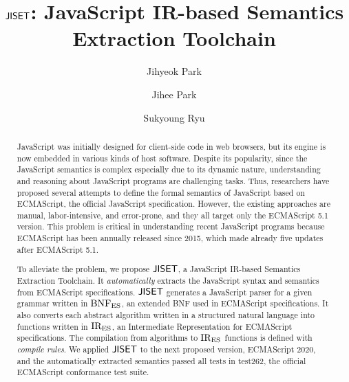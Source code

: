 \documentclass[sigconf,review,anonymous=true]{acmart}
\begin{document}
\title{\( \text{\sf JISET} \): JavaScript IR-based Semantics Extraction Toolchain}

\author{Jihyeok Park}

\author{Jihee Park}

\author{Sukyoung Ryu}

\begin{abstract}
JavaScript was initially designed for client-side code in web browsers,
but its engine is now embedded in various kinds of host software.
Despite its popularity, since the JavaScript semantics is complex
especially due to its dynamic nature, understanding and reasoning
about JavaScript programs are challenging tasks.  Thus,
researchers have proposed several attempts to define the formal semantics
of JavaScript based on ECMAScript, the official JavaScript specification.
However, the existing approaches are manual, labor-intensive, and
error-prone, and they all target only the ECMAScript 5.1 version.
This problem is critical in understanding recent JavaScript programs
because ECMAScript has been annually released since 2015, which made
already five updates after ECMAScript 5.1.

To alleviate the problem, we propose \( \text{\sf JISET} \), a JavaScript IR-based Semantics
Extraction Toolchain.  It \textit{automatically} extracts the JavaScript syntax and
semantics from ECMAScript specifications.  \( \text{\sf JISET} \) generates a JavaScript
parser for a given grammar written in \( \text{BNF}_{\text{ES}} \), an extended BNF
used in ECMAScript specifications.  It also converts each
abstract algorithm written in a structured natural language into
functions written in \( \text{IR}_\text{ES} \), an Intermediate Representation
for ECMAScript specifications.  The compilation from algorithms to
\( \text{IR}_\text{ES} \) functions is defined with \textit{compile rules}.
We applied \( \text{\sf JISET} \) to the next proposed version, ECMAScript 2020,
and the automatically extracted semantics passed all  tests 
in test262, the official ECMAScript conformance test suite.
\end{abstract}


\maketitle












\end{document}
